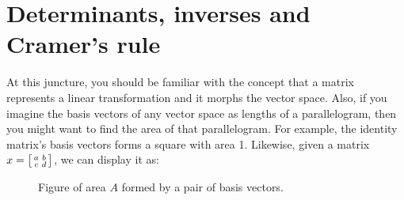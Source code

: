 
\section{Determinants, inverses and Cramer's rule}
At this juncture, you should be familiar with the concept that a matrix represents a linear transformation and it morphs the vector space. Also, if you imagine the basis vectors of any vector space as lengths of a parallelogram, then you might want to find the area of that parallelogram. For example, the identity matrix's basis vectors forms a square with area 1. Likewise, given a matrix \(x=\begin{bsmallmatrix}
  a & b \\
  c & d
\end{bsmallmatrix} \), we can display it as:
\begin{figure}[h]
  \centering
  \caption{Figure of area \(A\) formed by a pair of basis vectors.}
  \label{detarea}
\end{figure}


